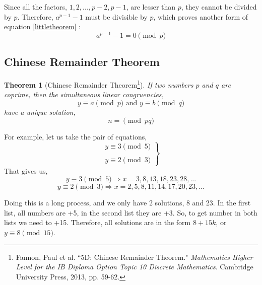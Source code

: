 \documentclass[a4paper,12pt]{article}
\newtheorem{theorem}{Theorem}
\theoremstyle{definition}
\begin{document}
Since all the factors, $1,2,...,p-2,p-1$, are lesser than $p$, they cannot be divided by $p$. Therefore, $a^{p-1} -1$ must be divisible by $p$, which proves another form of equation \ref{littletheorem} :
\begin{equation}
		a^{p-1} -1= 0 \pmod p
\end{equation}

\subsection{Chinese Remainder Theorem} \label{chineseremaindersection}
\begin{theorem}[Chinese Remainder Theorem\footnote{Fannon, Paul et al. ``5D: Chinese Remainder Theorem." \textit{Mathematics Higher Level for the IB Diploma Option Topic 10 Discrete Mathematics}. Cambridge University Press, 2013, pp. 59-62.}]\label{chineseremainder}
	If two numbers $p$ and $q$ are coprime, then the simultaneous linear congruencies,
	\begin{equation*}
		\text{} y \equiv a \pmod p \text{ and } y \equiv b \pmod q
	\end{equation*}
	  have a unique solution,
	  \begin{equation*}
	  	n=\pmod{pq}
	  \end{equation*}
\end{theorem}
For example, let us take the pair of equations,
\begin{equation*}
	    \left.
        \begin{aligned}
            y \equiv 3 \pmod 5\\
            \\
            y \equiv 2 \pmod 3
        \end{aligned}
    \right\}
\end{equation*}
\indent That gives us,
\begin{equation*}
	y \equiv 3 \pmod 5 \Rightarrow x=3,8,13,18,23,28,...
\end{equation*}
\begin{equation*}
	y \equiv 2 \pmod 3 \Rightarrow x=2,5,8,11,14,17,20,23,...
\end{equation*}

Doing this is a long process, and we only have 2 solutions, 8 and 23. In the first list, all numbers are +5, in the second list they are +3. So, to get number in both lists we need to +15. Therefore, all solutions are in the form $8+15k$, or $y \equiv 8 \pmod{15}$.
\end{document}
